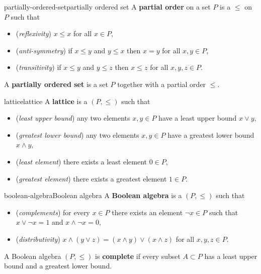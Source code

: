 \begin{topic}{partially-ordered-set}{partially ordered set}
    A \textbf{partial order} on a set $P$ is a  $\le$ on $P$ such that
    \begin{itemize}
        \item (\textit{reflexivity}) $x \le x$ for all $x \in P$,
        \item (\textit{anti-symmetry}) if $x \le y$ and $y \le x$ then $x = y$ for all $x, y \in P$,
        \item (\textit{transitivity}) if $x \le y$ and $y \le z$ then $x \le z$ for all $x, y, z \in P$.
    \end{itemize}
    A \textbf{partially ordered set} is a set $P$ together with a partial order $\le$.
\end{topic}

\begin{topic}{lattice}{lattice}
    A \textbf{lattice} is a  $(P, \le)$ such that
    \begin{itemize}
        \item (\textit{least upper bound}) any two elements $x, y \in P$ have a least upper bound $x \vee y$,
        \item (\textit{greatest lower bound}) any two elements $x, y \in P$ have a greatest lower bound $x \wedge y$,
        \item (\textit{least element}) there exists a least element $0 \in P$,
        \item (\textit{greatest element}) there exists a greatest element $1 \in P$.
    \end{itemize}
\end{topic}

\begin{topic}{boolean-algebra}{Boolean algebra}
    A \textbf{Boolean algebra} is a  $(P, \le)$ such that
    \begin{itemize}
        \item (\textit{complements}) for every $x \in P$ there exists an element $\neg x \in P$ such that $x \vee \neg x = 1$ and $x \wedge \neg x = 0$,
        \item (\textit{distributivity}) $x \wedge (y \vee z) = (x \wedge y) \vee (x \wedge z)$ for all $x, y, z \in P$.
    \end{itemize}
    A Boolean algebra $(P, \le)$ is \textbf{complete} if every subset $A \subset P$ has a least upper bound and a greatest lower bound.
\end{topic}

